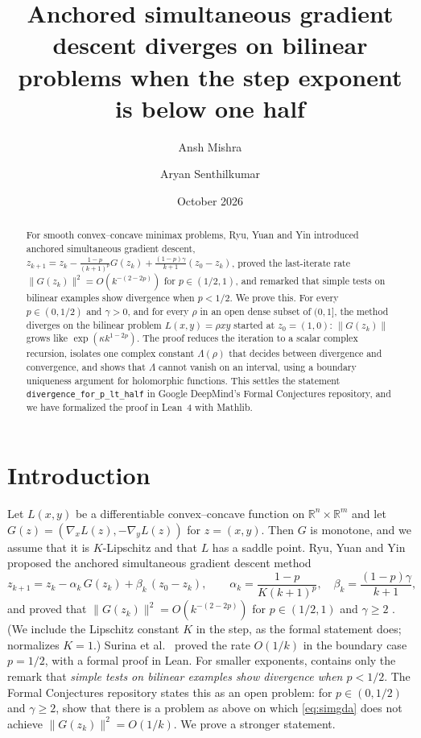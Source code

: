 \documentclass[11pt]{amsart}
\theoremstyle{remark}
\newcommand{\R}{\mathbb{R}}
\newcommand{\lean}[1]{\texttt{#1}}
\begin{document}
\title[SimGD-A below one half]{Anchored simultaneous gradient descent diverges on bilinear problems when the step exponent is below one half}

\author{Ansh Mishra}
\author{Aryan Senthilkumar}

\date{October 2026}

\begin{abstract}
For smooth convex--concave minimax problems, Ryu, Yuan and Yin introduced anchored simultaneous gradient descent,
$z_{k+1}=z_k-\frac{1-p}{(k+1)^p}G(z_k)+\frac{(1-p)\gamma}{k+1}(z_0-z_k)$, proved the last-iterate rate $\|G(z_k)\|^2=O(k^{-(2-2p)})$ for $p\in(1/2,1)$, and remarked that simple tests on bilinear examples show divergence when $p<1/2$.
We prove this.
For every $p\in(0,1/2)$ and $\gamma>0$, and for every $\rho$ in an open dense subset of $(0,1]$, the method diverges on the bilinear problem $L(x,y)=\rho xy$ started at $z_0=(1,0)$: $\|G(z_k)\|$ grows like $\exp(\kappa k^{1-2p})$.
The proof reduces the iteration to a scalar complex recursion, isolates one complex constant $\Lambda(\rho)$ that decides between divergence and convergence, and shows that $\Lambda$ cannot vanish on an interval, using a boundary uniqueness argument for holomorphic functions.
This settles the statement \lean{divergence\_for\_p\_lt\_half} in Google DeepMind's Formal Conjectures repository, and we have formalized the proof in Lean~4 with Mathlib.
\end{abstract}

\maketitle

\section{Introduction}

Let $L(x,y)$ be a differentiable convex--concave function on $\R^n\times\R^m$ and let $G(z)=(\nabla_xL(z),-\nabla_yL(z))$ for $z=(x,y)$.
Then $G$ is monotone, and we assume that it is $K$-Lipschitz and that $L$ has a saddle point.
Ryu, Yuan and Yin \cite{RYY} proposed the anchored simultaneous gradient descent method
\begin{equation}\label{eq:simgda}
z_{k+1}=z_k-\alpha_k\,G(z_k)+\beta_k\,(z_0-z_k),\qquad \alpha_k=\frac{1-p}{K(k+1)^p},\quad \beta_k=\frac{(1-p)\gamma}{k+1},
\end{equation}
and proved that $\|G(z_k)\|^2=O(k^{-(2-2p)})$ for $p\in(1/2,1)$ and $\gamma\ge2$ \cite[Theorem~3]{RYY}.
(We include the Lipschitz constant $K$ in the step, as the formal statement \cite{FC} does; \cite{RYY} normalizes $K=1$.)
Surina et al.\ \cite{Surina} proved the rate $O(1/k)$ in the boundary case $p=1/2$, with a formal proof in Lean.
For smaller exponents, \cite[\S4.2]{RYY} contains only the remark that \emph{simple tests on bilinear examples show divergence when $p<1/2$}.
The Formal Conjectures repository \cite{FC} states this as an open problem: for $p\in(0,1/2)$ and $\gamma\ge2$, show that there is a problem as above on which \eqref{eq:simgda} does not achieve $\|G(z_k)\|^2=O(1/k)$.
We prove a stronger statement.
\end{document}
